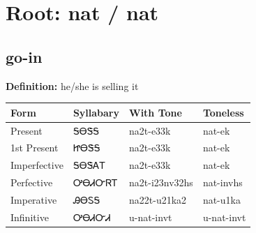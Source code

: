 \documentclass{article}%
\begin{document}
%
\normalsize%
\section*{Root: nat / nat}%
\subsection*{go-in}%
\textbf{Definition: }%
he/she is selling it%
\\[0.5em]%
\begin{tabular}{|l|l|l|l|}%
\hline%
\textbf{Form}&\textbf{Syllabary}&\textbf{With Tone}&\textbf{Toneless}\\%
\hline%
Present&ᎦᎾᏕᎦ&na2t{-}e33k&nat{-}ek\\%
1st Present&ᏥᎾᏕᎦ&na2t{-}e33k&nat{-}ek\\%
Imperfective&ᎦᎾᏕᎪᎢ&na2t{-}e33k&nat{-}ek\\%
Perfective&ᎤᎾᏗᏅᏒᎢ&na2t{-}i23nv32hs&nat{-}invhs\\%
Imperative&ᎯᎾᏚᎦ&na22t{-}u21ka2&nat{-}u1ka\\%
Infinitive&ᎤᎾᏗᏅᏗ&u{-}nat{-}invt&u{-}nat{-}invt\\%
\hline%
\end{tabular}%
\\[1em]%
\end{document}
